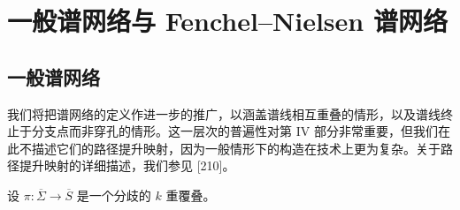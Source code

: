 
\chapter{一般谱网络与 Fenchel–Nielsen 谱网络}


\section{一般谱网络}

我们将把谱网络的定义作进一步的推广，以涵盖谱线相互重叠的情形，以及谱线终止于分支点而非穿孔的情形。这一层次的普遍性对第 IV 部分非常重要，但我们在此不描述它们的路径提升映射，因为一般情形下的构造在技术上更为复杂。关于路径提升映射的详细描述，我们参见 [210]。

设 $\pi\colon\overline{\Sigma}\to\overline{S}$ 是一个分歧的 $k$ 重覆叠。

